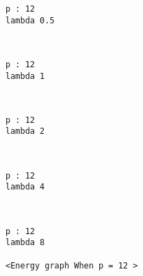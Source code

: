 \documentclass[11pt]{article}
\begin{document}
    \begin{Verbatim}[commandchars=\\\{\}]
p : 12
lambda 0.5

    \end{Verbatim}

    \begin{center}
    \end{center}
    { \hspace*{\fill} \\}
    
    \begin{Verbatim}[commandchars=\\\{\}]
p : 12
lambda 1

    \end{Verbatim}

    \begin{center}
    \end{center}
    { \hspace*{\fill} \\}
    
    \begin{Verbatim}[commandchars=\\\{\}]
p : 12
lambda 2

    \end{Verbatim}

    \begin{center}
    \end{center}
    { \hspace*{\fill} \\}
    
    \begin{Verbatim}[commandchars=\\\{\}]
p : 12
lambda 4

    \end{Verbatim}

    \begin{center}
    \end{center}
    { \hspace*{\fill} \\}
    
    \begin{Verbatim}[commandchars=\\\{\}]
p : 12
lambda 8

<Energy graph When p = 12 >

    \end{Verbatim}
\end{document}
